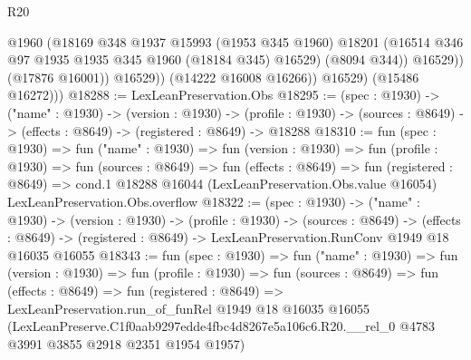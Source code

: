\begin{lexlean}{R20}
\begin{coremodule}
                      @1960
                      (@18169
                        @348
                        @1937
                        @15993
                        (@1953 @345 @1960)
                        @18201
                        (@16514 @346 @97 @1935 @1935 @345 @1960 (@18184 @345) @16529)
                        (@8094 @344))
                      @16529))
                  (@17876 @16001))
                @16529))
            (@14222 @16008 @16266))
          @16529)
        (@15486 @16272)))
@18288 := LexLeanPreservation.Obs
@18295 := (spec : @1930) ->
  ("name" : @1930) ->
  (version : @1930) ->
  (profile : @1930) -> (sources : @8649) -> (effects : @8649) -> (registered : @8649) -> @18288
@18310 := fun (spec : @1930) =>
  fun ("name" : @1930) =>
  fun (version : @1930) =>
  fun (profile : @1930) =>
  fun (sources : @8649) =>
  fun (effects : @8649) =>
  fun (registered : @8649) =>
  cond.{1} @18288 @16044 (LexLeanPreservation.Obs.value @16054) LexLeanPreservation.Obs.overflow
@18322 := (spec : @1930) ->
  ("name" : @1930) ->
  (version : @1930) ->
  (profile : @1930) ->
  (sources : @8649) ->
  (effects : @8649) -> (registered : @8649) -> LexLeanPreservation.RunConv @1949 @18 @16035 @16055
@18343 := fun (spec : @1930) =>
  fun ("name" : @1930) =>
  fun (version : @1930) =>
  fun (profile : @1930) =>
  fun (sources : @8649) =>
  fun (effects : @8649) =>
  fun (registered : @8649) =>
  LexLeanPreservation.run_of_funRel
    @1949
    @18
    @16035
    @16055
    (LexLeanPreserve.C1f0aab9297edde4fbc4d8267e5a106c6.R20.__rel_0
      @4783
      @3991
      @3855
      @2918
      @2351
      @1954
      @1957)
\end{coremodule}
\end{lexlean}
